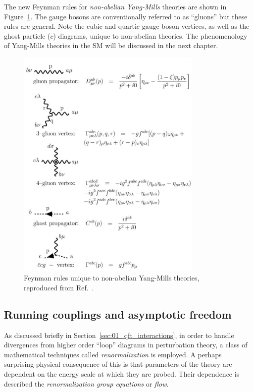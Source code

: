 The new Feynman rules for \textit{non-abelian Yang-Mills} theories are shown in Figure~\ref{fig:01_qft_gt_yangmills_feynman}.
The gauge bosons are conventionally referred to as ``gluons'' but these rules are general.
Note the cubic and quartic gauge boson vertices, as well as the ghost particle ($c$) diagrams, unique to non-abelian theories.
The phenomenology of Yang-Mills theories in the SM will be discussed in the next chapter.

\begin{figure}[ht!]
	\centering
	\includegraphics[width=0.8\textwidth]{figures/01-SM-02-QFT/Feynman/yangmills}
	\caption{Feynman rules unique to non-abelian Yang-Mills theories, reproduced from Ref.~\cite{enwiki:1243569653}.}
	\label{fig:01_qft_gt_yangmills_feynman}
\end{figure}


\subsection{Running couplings and asymptotic freedom}
\label{sec:01_qft_gt_asymptotic}

As discussed briefly in Section~\ref{sec:01_qft_interactions}, in order to handle divergences from higher order ``loop'' diagrams in perturbation theory, a class of mathematical techniques called \textit{renormalization} is employed.
A perhaps surprising physical consequence of this is that parameters of the theory are dependent on the energy scale at which they are probed.
Their dependence is described the \textit{renormalization group equations} or \textit{flow}.

